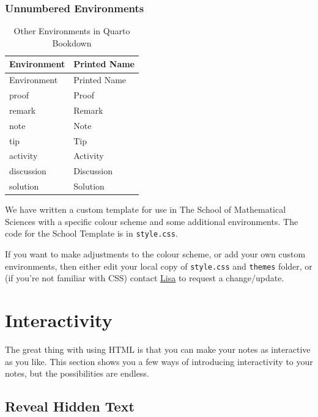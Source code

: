 \documentclass[
  letterpaper,
  oneside]{book}
\numberwithin{equation}{section}
\numberwithin{figure}{section}
\theoremstyle{break}
\theoremstyle{plain}
\theoremstyle{remark}
\begin{document}
\subsection{Unnumbered Environments}\label{unnumbered-environments}

\begin{longtable}[]{@{}ll@{}}
\caption{Other Environments in Quarto
Bookdown}\label{tbl-otherEnv}\tabularnewline
\toprule\noalign{}
Environment & Printed Name \\
\midrule\noalign{}
\endfirsthead
\toprule\noalign{}
Environment & Printed Name \\
\midrule\noalign{}
\endhead
\bottomrule\noalign{}
\endlastfoot
proof & Proof \\
remark & Remark \\
note & Note \\
tip & Tip \\
activity & Activity \\
discussion & Discussion \\
solution & Solution \\
\end{longtable}

We have written a custom template for use in The School of Mathematical
Sciences with a specific colour scheme and some additional environments.
The code for the School Template is in \texttt{style.css}.

If you want to make adjustments to the colour scheme, or add your own
custom environments, then either edit your local copy of
\texttt{style.css} and \texttt{themes} folder, or (if you're not
familiar with CSS) contact
\href{mailto:lisa.mott@nottingham.ac.uk}{Lisa} to request a
change/update.


\chapter{Interactivity}\label{interactivity}

The great thing with using HTML is that you can make your notes as
interactive as you like. This section shows you a few ways of
introducing interactivity to your notes, but the possibilities are
endless.

\section{Reveal Hidden Text}\label{reveal-hidden-text}
\end{document}
